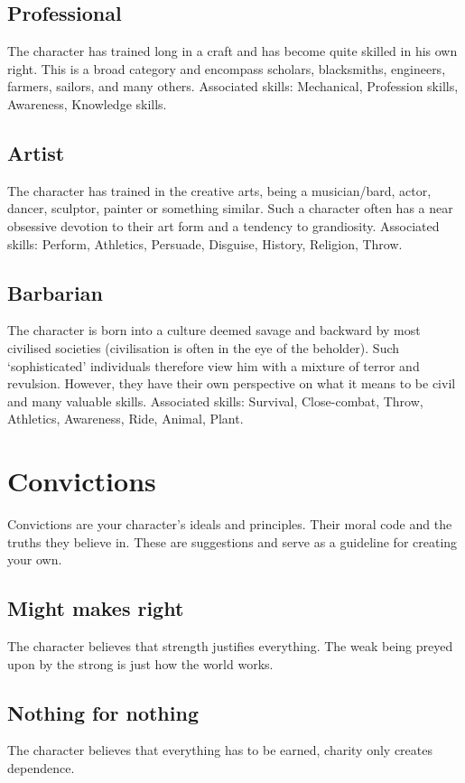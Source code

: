 \documentclass[a4paper,10pt,oneside]{book}
\begin{document}
\subsection{Professional}
The character has trained long in a craft and has become quite skilled in his own right. This is a broad category and encompass scholars, blacksmiths, engineers, farmers, sailors, and many others. Associated skills: Mechanical, Profession skills, Awareness, Knowledge skills. 

\subsection{Artist}
The character has trained in the creative arts, being a musician/bard, actor, dancer, sculptor, painter or something similar. Such a character often has a near obsessive devotion to their art form and a tendency to grandiosity. Associated skills: Perform, Athletics, Persuade, Disguise, History, Religion, Throw.

\subsection{Barbarian}
The character is born into a culture deemed savage and backward by most civilised societies (civilisation is often in the eye of the beholder). Such `sophisticated' individuals therefore view him with a mixture of terror and revulsion. However, they have their own perspective on what it means to be civil and many valuable skills. Associated skills: Survival, Close-combat, Throw, Athletics, Awareness, Ride, Animal, Plant.



\section{Convictions}
\label{sec:convictions}
Convictions are your character's ideals and principles. Their moral code and the truths they believe in. These are suggestions and serve as a guideline for creating your own.

\subsection{Might makes right}
The character believes that strength justifies everything. The weak being preyed upon by the strong is just how the world works. 

\subsection{Nothing for nothing}
The character believes that everything has to be earned, charity only creates dependence.
\end{document}
